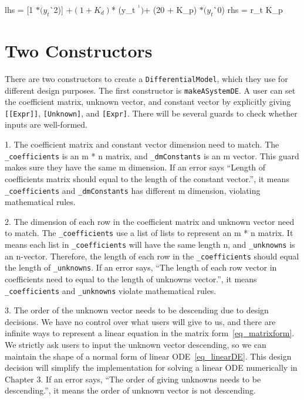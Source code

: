 \begin{listing}
\begin{haskell1}
lhs = [1 $* (y_t $^^ 2)]
	$+ (1 + K_d) $* (y_t $^^ 1)
	$+ (20 + K_p) $* (y_t $^^ 0)
rhs = r_t K_p
\end{haskell1}
\label{code_exinputl}
\end{listing}

\section{Two Constructors}
There are two constructors to create a \verb|DifferentialModel|, which they use for different design purposes. The first constructor is \verb|makeASystemDE|. A user can set the coefficient matrix, unknown vector, and constant vector by explicitly giving \verb|[[Expr]]|, \verb|[Unknown]|, and \verb|[Expr]|. There will be several guards to check whether inputs are well-formed.

1. The coefficient matrix and constant vector dimension need to match. The \verb|_coefficients| is an m * n matrix, and \verb|_dmConstants| is an m vector. This guard makes sure they have the same m dimension. If an error says ``Length of coefficients matrix should equal to the length of the constant vector.'', it means \verb|_coefficients| and \verb|_dmConstants| has different m dimension, violating mathematical rules.

2. The dimension of each row in the coefficient matrix and unknown vector need to match. The \verb|_coefficients| use a list of lists to represent an m * n matrix. It means each list in \verb|_coefficients| will have the same length n, and \verb|_unknowns| is an n-vector. Therefore, the length of each row in the \verb|_coefficients| should equal the length of \verb|_unknowns|. If an error says, ``The length of each row vector in coefficients need to equal to the length of unknowns vector.'', it means \verb|_coefficients| and \verb|_unknowns| violate mathematical rules.

3. The order of the unknown vector needs to be descending due to design decisions. We have no control over what users will give to us, and there are infinite ways to represent a linear equation in the matrix form~\ref{eq_matrixform}. We strictly ask users to input the unknown vector descending, so we can maintain the shape of a normal form of linear ODE~\ref{eq_linearDE}. This design decision will simplify the implementation for solving a linear ODE numerically in Chapter 3. If an error says, ``The order of giving unknowns needs to be descending.'', it means the order of unknown vector is not descending.

